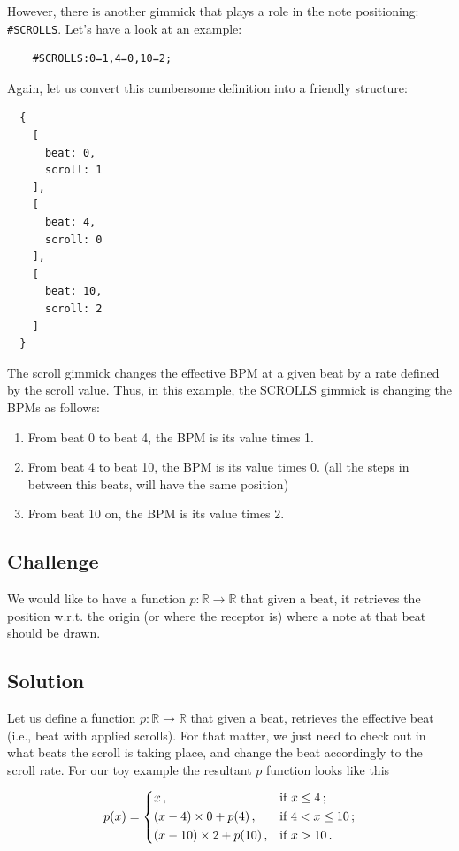 \documentclass[a4paper,9pt]{article}
\begin{document}
    However, there is another gimmick that plays a role in the note positioning: \texttt{\#SCROLLS}. Let's have a look at an example:

    \begin{verbatim}
    #SCROLLS:0=1,4=0,10=2;     
    \end{verbatim}
    Again, let us convert this cumbersome definition into a friendly structure:
    \begin{verbatim}
  {
    [
      beat: 0,
      scroll: 1
    ],
    [
      beat: 4,
      scroll: 0 
    ],
    [
      beat: 10,
      scroll: 2 
    ]
  }
    \end{verbatim}
    The scroll gimmick changes the effective BPM at a given beat by a rate defined by the scroll value. Thus, in this example, the SCROLLS gimmick is changing the BPMs as follows:
    \begin{enumerate}
		\item From beat 0 to beat 4, the BPM is its value times 1.
		\item From beat 4 to beat 10, the BPM is its value times 0. (all the steps in between this beats, will have the same position)
		\item From beat 10 on, the BPM is its value times 2.
    \end{enumerate}
    \subsection{Challenge}

    We would like to have a function $ p: \mathbb{R} \rightarrow \mathbb{R} $ that given a beat, it retrieves the position w.r.t. the origin (or where the receptor is) where a note at that beat should be drawn.

    \subsection{Solution}

    Let us define a function $p: \mathbb{R}\rightarrow \mathbb{R}$ that given a beat, retrieves the effective beat (i.e., beat with applied scrolls). For that matter, we just need to check out in what beats the scroll is taking place, and change the beat accordingly to the scroll rate. For our toy example the resultant $p$ function looks like this


    \begin{equation}
	    p(x) = \begin{dcases}
		    x\,, & \text{if $x \leq 4\,;$}\\ 
		    (x-4)\times 0 + p(4)\,, & \text{if $4 < x \leq 10\,;$}\\ 
		    (x-10)\times 2+ p(10)\,, & \text{if $ x >  10\,.$}\\ 
	    \end{dcases}
	    \label{eq:beat2effective-bps}
    \end{equation}
\end{document}
